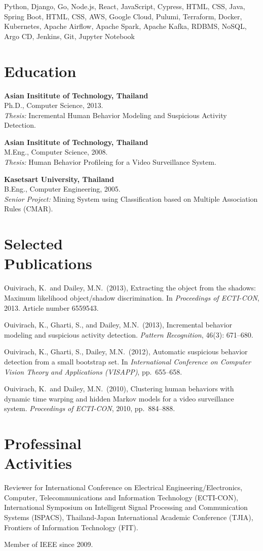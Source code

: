 \documentclass[margin, 10pt]{res}
\begin{document}
\begin{resume}
Python, Django, Go, Node.js, React, JavaScript, Cypress, HTML, CSS,
Java, Spring Boot, HTML, CSS, AWS, Google Cloud, Pulumi, Terraform,
Docker, Kubernetes, Apache Airflow, Apache Spark, Apache Kafka, RDBMS, NoSQL,
Argo CD, Jenkins, Git, Jupyter Notebook

\section{Education}

{\bf Asian Insititute of Technology, Thailand} \\
Ph.D., Computer Science, 2013. \\
{\it Thesis:} Incremental Human Behavior Modeling and Suspicious Activity
Detection.

{\bf Asian Insititute of Technology, Thailand} \\
M.Eng., Computer Science, 2008. \\
{\it Thesis:} Human Behavior Profileing for a Video Surveillance System.

{\bf Kasetsart University, Thailand} \\
B.Eng., Computer Engineering, 2005. \\
{\it Senior Project:} Mining System using Classification based on Multiple
Association Rules (CMAR).

\section{Selected \\ Publications}

Ouivirach, K.\ and Dailey, M.N.\ (2013), Extracting the object from the shadows:
Maximum likelihood object/shadow discrimination. In {\it Proceedings of
ECTI-CON}, 2013. Article number 6559543.

Ouivirach, K., Gharti, S., and Dailey, M.N.\ (2013), Incremental behavior
modeling  and suspicious activity detection. {\it Pattern Recognition}, 46(3):
671--680.

Ouivirach, K., Gharti, S., Dailey, M.N.\ (2012), Automatic suspicious behavior
detection from a small bootstrap set. In {\it International Conference on
Computer Vision Theory and Applications (VISAPP)}, pp.\ 655--658.

Ouivirach, K.\ and Dailey, M.N.\ (2010), Clustering human behaviors with
dynamic time warping and hidden Markov models for a video surveillance system.
{\it Proceedings of ECTI-CON}, 2010, pp.\ 884--888.

\section{Professinal \\ Activities}

Reviewer for International Conference on Electrical Engineering/Electronics,
Computer, Telecommunications and Information Technology (ECTI-CON),
International Symposium on Intelligent Signal Processing and Communication
Systems (ISPACS), Thailand-Japan International Academic Conference (TJIA),
Frontiers of Information Technology (FIT).

Member of IEEE since 2009.

\end{resume}
\end{document}

